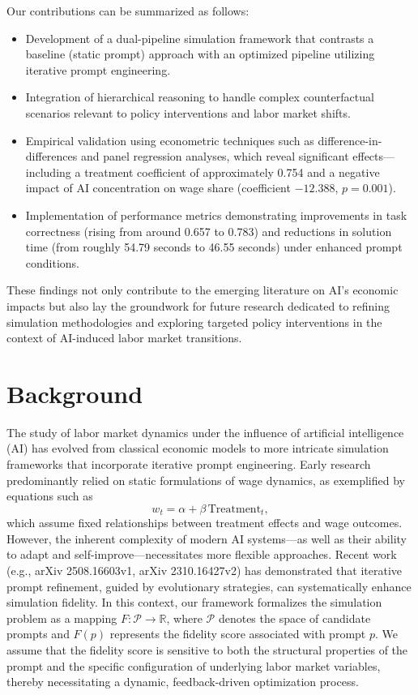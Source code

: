 \documentclass{article}
\begin{document}
Our contributions can be summarized as follows:
\begin{itemize}
    \item Development of a dual-pipeline simulation framework that contrasts a baseline (static prompt) approach with an optimized pipeline utilizing iterative prompt engineering.
    \item Integration of hierarchical reasoning to handle complex counterfactual scenarios relevant to policy interventions and labor market shifts.
    \item Empirical validation using econometric techniques such as difference-in-differences and panel regression analyses, which reveal significant effects—including a treatment coefficient of approximately 0.754 and a negative impact of AI concentration on wage share (coefficient \(-12.388\), \(p=0.001\)).
    \item Implementation of performance metrics demonstrating improvements in task correctness (rising from around 0.657 to 0.783) and reductions in solution time (from roughly 54.79 seconds to 46.55 seconds) under enhanced prompt conditions.
\end{itemize}
These findings not only contribute to the emerging literature on AI’s economic impacts but also lay the groundwork for future research dedicated to refining simulation methodologies and exploring targeted policy interventions in the context of AI-induced labor market transitions.

\section{Background}
The study of labor market dynamics under the influence of artificial intelligence (AI) has evolved from classical economic models to more intricate simulation frameworks that incorporate iterative prompt engineering. Early research predominantly relied on static formulations of wage dynamics, as exemplified by equations such as 
\[
w_t = \alpha + \beta\,\text{Treatment}_t,
\]
which assume fixed relationships between treatment effects and wage outcomes. However, the inherent complexity of modern AI systems—as well as their ability to adapt and self-improve—necessitates more flexible approaches. Recent work (e.g., arXiv 2508.16603v1, arXiv 2310.16427v2) has demonstrated that iterative prompt refinement, guided by evolutionary strategies, can systematically enhance simulation fidelity. In this context, our framework formalizes the simulation problem as a mapping \( F: \mathcal{P} \rightarrow \mathbb{R} \), where \(\mathcal{P}\) denotes the space of candidate prompts and \(F(p)\) represents the fidelity score associated with prompt \(p\). We assume that the fidelity score is sensitive to both the structural properties of the prompt and the specific configuration of underlying labor market variables, thereby necessitating a dynamic, feedback-driven optimization process.
\end{document}
